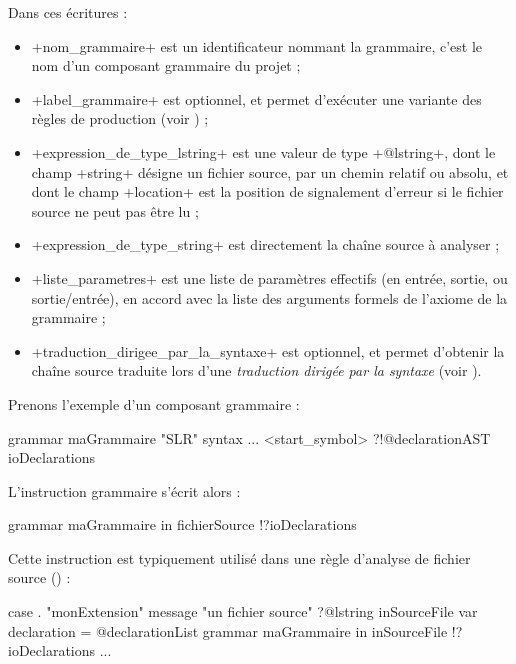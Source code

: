 Dans ces écritures :
\begin{itemize}
  \item \ggs+nom_grammaire+ est un identificateur nommant la grammaire, c'est le nom d'un composant grammaire du projet ;
  \item \ggs+label_grammaire+ est optionnel, et permet d'exécuter une variante des règles de production (voir ) ;
  \item \ggs+expression_de_type_lstring+ est une valeur de type \ggs+@lstring+, dont le champ \ggs+string+ désigne un fichier source, par un chemin relatif ou absolu, et dont le champ \ggs+location+ est la position de signalement d'erreur si le fichier source ne peut pas être lu ;
  \item \ggs+expression_de_type_string+ est directement la chaîne source à analyser ;
  \item \ggs+liste_parametres+ est une liste de paramètres effectifs (en entrée, sortie, ou sortie/entrée), en accord avec la liste des arguments formels de l'axiome de la grammaire ;
  \item \ggs+traduction_dirigee_par_la_syntaxe+ est optionnel, et permet d'obtenir la chaîne source traduite lors d'une \emph{traduction dirigée par la syntaxe} (voir ).
\end{itemize}


Prenons l'exemple d'un composant grammaire :
\begin{galgas}
grammar maGrammaire "SLR" {
  syntax ...
   <start_symbol> ?!@declarationAST ioDeclarations
}
\end{galgas}

L'instruction grammaire s'écrit alors :
\begin{galgas}
grammar maGrammaire in fichierSource !?ioDeclarations
\end{galgas}

Cette instruction est typiquement utilisé dans une règle d'analyse de fichier source () :

\begin{galgas}
case . "monExtension"
message "un fichier source"
?@lstring inSourceFile {
  var declaration = @declarationList {}
  grammar maGrammaire in inSourceFile !?ioDeclarations
  ...
}
\end{galgas}















